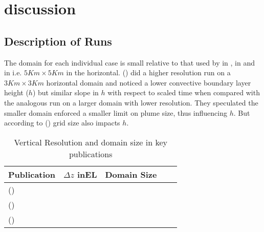 
\chapter{discussion}
\label{ch:results}
\setlength{\parindent}{0cm}

\section{Description of Runs}
\FloatBarrier

The domain for each individual case is small relative to that used by \citeauthor{SullMoengStev} in \cite{SullMoengStev}, \citeauthor{FedConzMir04} in \cite{FedConzMir04} and \citeauthor{BrooksFowler2} in \cite{BrooksFowler2} i.e. $5Km \times 5 Km$ in the horizontal.  \citeauthor{SullMoengStev} (\cite{SullMoengStev}) did a higher resolution run on a $3 Km \times 3 Km$ horizontal domain and noticed a lower convective boundary layer height ($h$) but similar slope in $h$ with respect to scaled time when compared with the analogous run on a larger domain with lower resolution.  They speculated the smaller domain enforced a smaller limit on plume size, thus influencing $h$. But according to \citeauthor{SullPat} (\cite{SullPat}) grid size also impacts $h$. \\

\begin{table}[htbp]
    \begin{center}
    \begin{tabular}{ p{2cm} p{2cm}  p{2cm}  p{2cm} p{2cm} }
Publication & $\Delta z$ in\acs{EL} & Domain Size\\ \hline
      \citeauthor{SullMoengStev} (\citeyear{SullMoengStev}) & &  \\ \hline 
      \citeauthor{FedConzMir04} (\citeyear{FedConzMir04}) &  &  \\ [.3cm] %
      \citeauthor{BrooksFowler2} (\citeyear{BrooksFowler2}) &  &  \\ \hline
    \end{tabular}
\caption[]{Vertical Resolution and domain size in key publications}
\label{table:reldefs}   
\end{center}    
\end{table}


